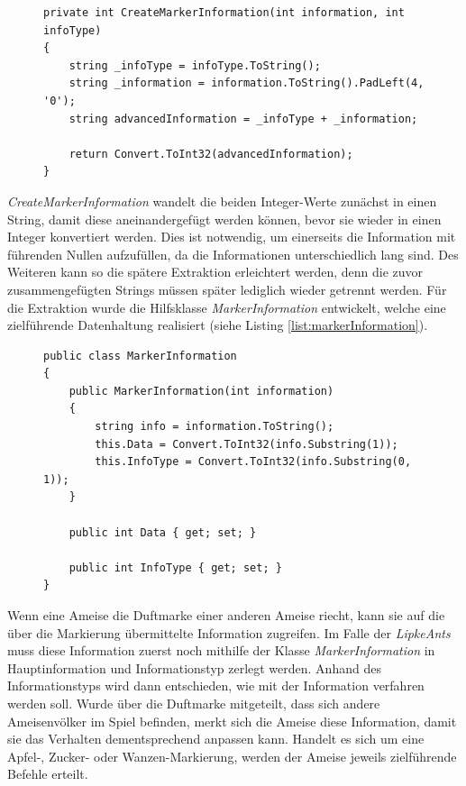 \begin{figure}[bht]
\begin{lstlisting}[caption=Methode zum Erstellen verbesserter Marker-Informationen, label=list:createMarkerInformation]
private int CreateMarkerInformation(int information, int infoType)
{
    string _infoType = infoType.ToString();
    string _information = information.ToString().PadLeft(4, '0');
    string advancedInformation = _infoType + _information;

    return Convert.ToInt32(advancedInformation);
}
\end{lstlisting}
\end{figure}

\textit{CreateMarkerInformation} wandelt die beiden Integer-Werte zunächst in einen String,  damit diese aneinandergefügt werden können, bevor sie wieder in einen Integer konvertiert werden. Dies ist notwendig, um einerseits die Information mit führenden Nullen aufzufüllen, da die Informationen unterschiedlich lang sind. Des Weiteren kann so die spätere Extraktion erleichtert werden, denn die zuvor zusammengefügten Strings müssen später lediglich wieder getrennt werden. Für die Extraktion wurde die Hilfsklasse \textit{MarkerInformation} entwickelt, welche eine zielführende Datenhaltung realisiert (siehe Listing \ref{list:markerInformation}).

\begin{figure}[bht]
\begin{lstlisting}[caption=Hilfsklasse zum Extrahieren der verbesserten Marker-Informationen, label=list:markerInformation]
public class MarkerInformation
{
    public MarkerInformation(int information)
    {
        string info = information.ToString();
        this.Data = Convert.ToInt32(info.Substring(1));
        this.InfoType = Convert.ToInt32(info.Substring(0, 1));
    }

    public int Data { get; set; }

    public int InfoType { get; set; }
}
\end{lstlisting}
\end{figure}

Wenn eine Ameise die Duftmarke einer anderen Ameise riecht, kann sie auf die über die Markierung übermittelte Information zugreifen. Im Falle der \textit{LipkeAnts} muss diese Information zuerst noch mithilfe der Klasse \textit{MarkerInformation} in Hauptinformation und Informationstyp zerlegt werden. Anhand des Informationstyps wird dann entschieden, wie mit der Information verfahren werden soll. Wurde über die Duftmarke mitgeteilt, dass sich andere Ameisenvölker im Spiel befinden, merkt sich die Ameise diese Information, damit sie das Verhalten dementsprechend anpassen kann. Handelt es sich um eine Apfel-, Zucker- oder Wanzen-Markierung, werden der Ameise jeweils zielführende Befehle erteilt.

